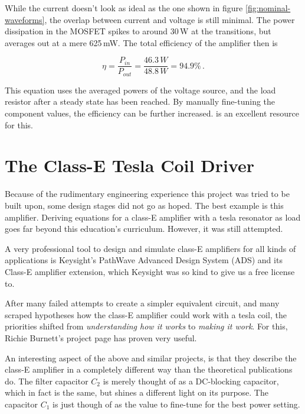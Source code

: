 While the current doesn't look as ideal as the one shown in figure \ref{fig:nominal-waveforms}, the overlap between current and voltage is still minimal. The power dissipation in the MOSFET spikes to around 30\,W at the transitions, but averages out at a mere 625\,mW. The total efficiency of the amplifier then is

\begin{equation}
    \eta = \frac{P_{in}}{P_{out}} = \frac{46.3\,W}{48.8\,W} = 94.9\%\,.
\end{equation}

This equation uses the averaged powers of the voltage source, and the load resistor after a steady state has been reached. By manually fine-tuning the component values, the efficiency can be further increased. 
is an excellent resource for this.

\section{The Class-E Tesla Coil Driver}

Because of the rudimentary engineering experience this project was tried to be built upon, some design stages did not go as hoped. The best example is this amplifier. Deriving equations for a class-E amplifier with a tesla resonator as load goes far beyond this education's curriculum. However, it was still attempted.

A very professional tool to design and simulate class-E amplifiers for all kinds of applications is Keysight's PathWave Advanced Design System (ADS) and its Class-E amplifier extension, which Keysight was so kind to give us a free license to. %

After many failed attempts to create a simpler equivalent circuit, and many scraped hypotheses how the class-E amplifier could work with a tesla coil, the priorities shifted from \emph{understanding how it works} to \emph{making it work}. For this, Richie Burnett's project page has proven very useful.

An interesting aspect of the above and similar projects, is that they describe the class-E amplifier in a completely different way than the theoretical publications do. The filter capacitor \(C_2\) is merely thought of as a DC-blocking capacitor, which in fact is the same, but shines a different light on its purpose. The capacitor \(C_1\) is just though of as the value to fine-tune for the best power setting.

